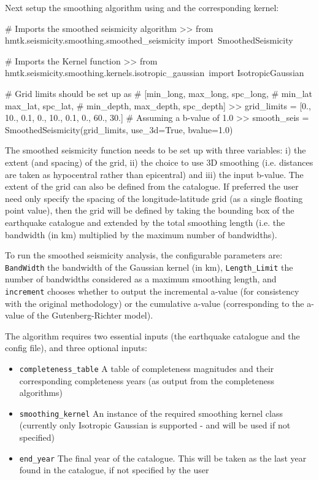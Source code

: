 Next setup the smoothing algorithm using and the corresponding kernel:

\begin{python}[frame=single]

# Imports the smoothed seismicity algorithm
>> from hmtk.seismicity.smoothing.smoothed_seismicity import\
    SmoothedSeismicity

# Imports the Kernel function
>> from hmtk.seismicity.smoothing.kernels.isotropic_gaussian\
    import IsotropicGaussian

# Grid limits should be set up as 
# [min_long, max_long, spc_long, 
#  min_lat max_lat, spc_lat,
#  min_depth, max_depth, spc_depth]
>> grid_limits = [0., 10., 0.1, 0., 10., 0.1, 0., 60., 30.]
# Assuming a b-value of 1.0
>> smooth_seis = SmoothedSeismicity(grid_limits,
                                    use_3d=True,
                                    bvalue=1.0)
\end{python}

The smoothed seismicity function needs to be set up with three variables: i) the extent (and spacing) of the grid, ii) the choice to use 3D smoothing (i.e. distances are taken as hypocentral rather than epicentral) and iii) the input b-value. The extent of the grid can also be defined from the catalogue. If preferred the user need only specify the spacing of the longitude-latitude grid (as a single floating point value), then the grid will be defined by taking the bounding box of the earthquake catalogue and extended by the total smoothing length (i.e. the bandwidth (in km) multiplied by the maximum number of bandwidths). 

To run the smoothed seismicity analysis, the configurable parameters are: \verb=BandWidth= the bandwidth of the Gaussian kernel (in km), \verb=Length_Limit= the number of bandwidths considered as a maximum smoothing length, and \verb=increment= chooses whether to output the incremental a-value (for consistency with the original \cite{frankel1995} methodology) or the cumulative a-value (corresponding to the a-value of the Gutenberg-Richter model).


The algorithm requires two essential inputs (the earthquake catalogue and the config file), and three optional inputs:

\begin{itemize}
\item \verb=completeness_table= A table of completeness magnitudes and their corresponding completeness years (as output from the completeness algorithms)

\item \verb=smoothing_kernel= An instance of the required smoothing
kernel class (currently only Isotropic Gaussian is supported - and will be used if not specified)

\item \verb=end_year= The final year of the catalogue. This will be taken as the last year found in the catalogue, if not specified by the user
\end{itemize}


